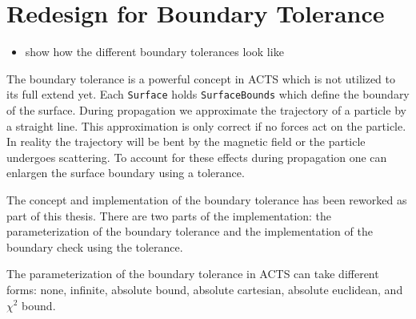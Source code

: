 \section{Redesign for Boundary Tolerance}

\begin{itemize}
    \color{red}
    \item show how the different boundary tolerances look like
\end{itemize}

The boundary tolerance is a powerful concept in ACTS which is not utilized to its full extend yet. Each \texttt{Surface} holds \texttt{SurfaceBounds} which define the boundary of the surface. During propagation we approximate the trajectory of a particle by a straight line. This approximation is only correct if no forces act on the particle. In reality the trajectory will be bent by the magnetic field or the particle undergoes scattering. To account for these effects during propagation one can enlargen the surface boundary using a tolerance.

The concept and implementation of the boundary tolerance has been reworked as part of this thesis. There are two parts of the implementation: the parameterization of the boundary tolerance and the implementation of the boundary check using the tolerance.

The parameterization of the boundary tolerance in ACTS can take different forms: none, infinite, absolute bound, absolute cartesian, absolute euclidean, and $\chi^2$ bound.

